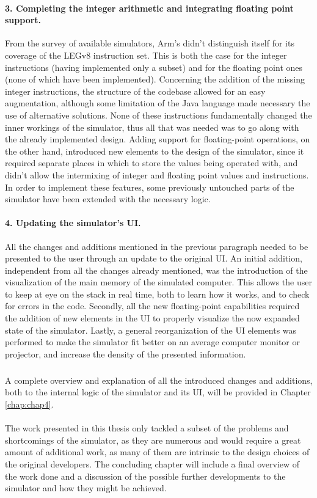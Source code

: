 \paragraph{3. Completing the integer arithmetic and integrating floating point support.}
From the survey of available simulators, Arm's didn't distinguish itself for its coverage of the LEGv8 instruction set. This is both the case for the integer instructions (having implemented only a subset) and for the floating point ones (none of which have been implemented).
Concerning the addition of the missing integer instructions, the structure of the codebase allowed for an easy augmentation, although some limitation of the Java language made necessary the use of alternative solutions. None of these instructions fundamentally changed the inner workings of the simulator, thus all that was needed was to go along with the already implemented design.
Adding support for floating-point operations, on the other hand, introduced new elements to the design of the simulator, since it required separate places in which to store the values being operated with, and didn't allow the intermixing of integer and floating point values and instructions. In order to implement these features, some previously untouched parts of the simulator have been extended with the necessary logic.

\paragraph{4. Updating the simulator's UI.}
All the changes and additions mentioned in the previous paragraph needed to be presented to the user through an update to the original UI.
An initial addition, independent from all the changes already mentioned, was the introduction of the visualization of the main memory of the simulated computer. This allows the user to keep at eye on the stack in real time, both to learn how it works, and to check for errors in the code.
Secondly, all the new floating-point capabilities required the addition of new elements in the UI to properly visualize the now expanded state of the simulator.
Lastly, a general reorganization of the UI elements was performed to make the simulator fit better on an average computer monitor or projector, and increase the density of the presented information.
\subparagraph{}
A complete overview and explanation of all the introduced changes and additions, both to the internal logic of the simulator and its UI, will be provided in Chapter \ref{chap:chap4}.

\paragraph{}
The work presented in this thesis only tackled a subset of the problems and shortcomings of the simulator, as they are numerous and would require a great amount of additional work, as many of them are intrinsic to the design choices of the original developers. The concluding chapter will include a final overview of the work done and a discussion of the possible further developments to the simulator and how they might be achieved.